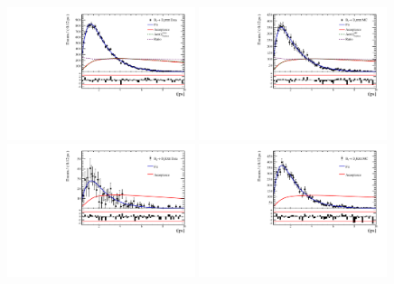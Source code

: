

\clearpage






\clearpage

\begin{figure}[h]
\includegraphics[height=!,width=0.49\textwidth]{figs/Acceptance/adaptive_N4/timeAccRatioFit_norm_Run1_t0.pdf}
\includegraphics[height=!,width=0.49\textwidth]{figs/Acceptance/adaptive_N4/timeAccRatioFit_norm_mc_Run1_t0.pdf}
\includegraphics[height=!,width=0.49\textwidth]{figs/Acceptance/adaptive_N4/timeAccRatioFit_signal_B0_Run1_t0.pdf}
\includegraphics[height=!,width=0.49\textwidth]{figs/Acceptance/adaptive_N4/timeAccRatioFit_signal_mc_Run1_t0.pdf}

\end{figure}
